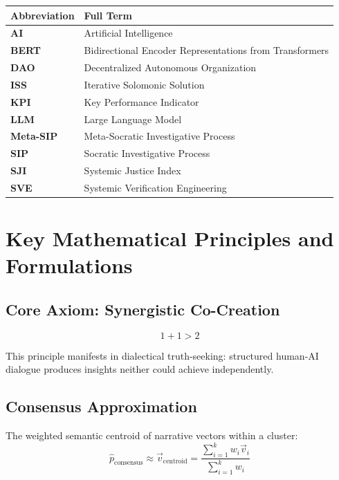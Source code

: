 \documentclass[11pt,a4paper]{article}
\begin{document}
\begin{tabular}{@{}>{\bfseries}ll@{}}
\toprule
\normalfont\textbf{Abbreviation} & \textbf{Full Term} \\
\midrule
AI & Artificial Intelligence \\
BERT & Bidirectional Encoder Representations from Transformers \\
DAO & Decentralized Autonomous Organization \\
ISS & Iterative Solomonic Solution \\
KPI & Key Performance Indicator \\
LLM & Large Language Model \\
Meta-SIP & Meta-Socratic Investigative Process \\
SIP & Socratic Investigative Process \\
SJI & Systemic Justice Index \\
SVE & Systemic Verification Engineering \\
\bottomrule
\end{tabular}

\vspace{1cm}

\section*{Key Mathematical Principles and Formulations}

\subsection*{Core Axiom: Synergistic Co-Creation}
\begin{equation}
1 + 1 > 2
\label{eq:synergy}
\end{equation}

\noindent This principle manifests in dialectical truth-seeking: structured human-AI dialogue produces insights neither could achieve independently.

\subsection*{Consensus Approximation}
The weighted semantic centroid of narrative vectors within a cluster:
\begin{equation}
\hat{p}_{\text{consensus}} \approx \vec{v}_{\text{centroid}} = \frac{\sum_{i=1}^{k}w_{i}\vec{v}_{i}}{\sum_{i=1}^{k}w_{i}}
\label{eq:consensus}
\end{equation}
\end{document}
